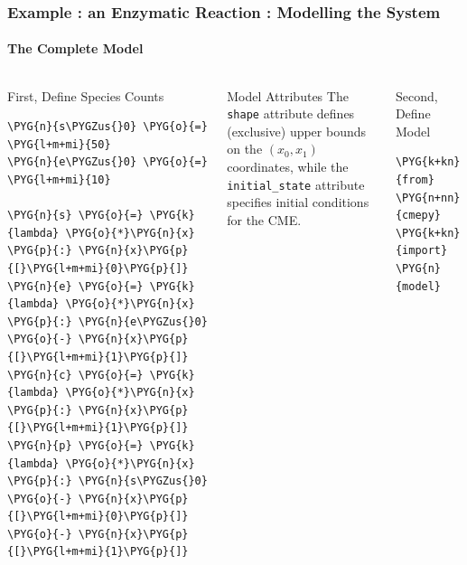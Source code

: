 \documentclass[hyperref={colorlinks=true}]{beamer}
\begin{document}
\begin{frame}[fragile]
\frametitle{Example : an Enzymatic Reaction : Modelling the System}
\framesubtitle{The Complete Model}
\begin{columns}[t]
\begin{block}{First, Define Species Counts}
\begin{Verbatim}[commandchars=\\\{\}, fontsize=\tiny]
\PYG{n}{s\PYGZus{}0} \PYG{o}{=} \PYG{l+m+mi}{50}
\PYG{n}{e\PYGZus{}0} \PYG{o}{=} \PYG{l+m+mi}{10}

\PYG{n}{s} \PYG{o}{=} \PYG{k}{lambda} \PYG{o}{*}\PYG{n}{x} \PYG{p}{:} \PYG{n}{x}\PYG{p}{[}\PYG{l+m+mi}{0}\PYG{p}{]}
\PYG{n}{e} \PYG{o}{=} \PYG{k}{lambda} \PYG{o}{*}\PYG{n}{x} \PYG{p}{:} \PYG{n}{e\PYGZus{}0} \PYG{o}{-} \PYG{n}{x}\PYG{p}{[}\PYG{l+m+mi}{1}\PYG{p}{]}
\PYG{n}{c} \PYG{o}{=} \PYG{k}{lambda} \PYG{o}{*}\PYG{n}{x} \PYG{p}{:} \PYG{n}{x}\PYG{p}{[}\PYG{l+m+mi}{1}\PYG{p}{]}
\PYG{n}{p} \PYG{o}{=} \PYG{k}{lambda} \PYG{o}{*}\PYG{n}{x} \PYG{p}{:} \PYG{n}{s\PYGZus{}0} \PYG{o}{-} \PYG{n}{x}\PYG{p}{[}\PYG{l+m+mi}{0}\PYG{p}{]} \PYG{o}{-} \PYG{n}{x}\PYG{p}{[}\PYG{l+m+mi}{1}\PYG{p}{]}
\end{Verbatim}
\end{block}
\begin{block}{Model Attributes}
The \verb+shape+ attribute defines (exclusive) upper bounds on the
$(x_0, x_1)$ coordinates, while the \verb+initial_state+ attribute specifies
initial conditions for the CME.
\end{block}
\begin{block}{Second, Define Model}
\begin{Verbatim}[commandchars=\\\{\}, fontsize=\tiny]
\PYG{k+kn}{from} \PYG{n+nn}{cmepy} \PYG{k+kn}{import} \PYG{n}{model}


\end{Verbatim}
\end{block}
\end{columns}
\end{frame}
\end{document}
